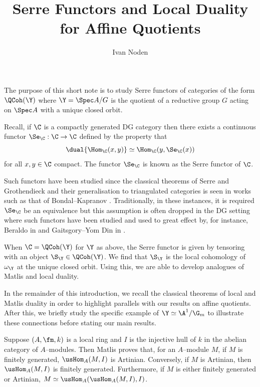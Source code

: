 \documentclass{amsart}
\title{Serre Functors and Local Duality for Affine Quotients}
\author{Ivan Noden}
\date{}
\begin{document}
  \maketitle

  \setcounter{tocdepth}{1}
  \tableofcontents


  The purpose of this short note is to study Serre functors
  of categories of the form \(\QCoh(\Y)\)
  where \(\Y = \Spec A/G\) is the quotient of
  a reductive group \(G\) acting on \(\Spec A\) with a
  unique closed orbit.

  \sssec{}

  Recall, if \(\C\) is a compactly generated DG category then there exists
  a continuous functor \(\Se_\C: \C \to \C\) defined by the
  property that
  \begin{displaymath}
    \dual{\Hom_{\C}(x,y)} \simeq \Hom_{\C}(y, \Se_\C(x))
  \end{displaymath}
  for all \(x, y \in \C\) compact. The functor \(\Se_\C\)
  is known as the Serre functor of \(\C\).

  Such functors have been studied since the classical
  theorems of Serre and Grothendieck and their
  generalisation to triangulated categories is seen
  in works such as that of Bondal--Kapranov \cite{bondal_kapranov:1990}.
  Traditionally, in these instances, it is required \(\Se_\C\)
  be an equivalence but this assumption is often
  dropped in the DG setting where such functors have been
  studied and used to great effect by, for instance,
  Beraldo in \cite{beraldo:2021} and Gaitsgory--Yom Din in
  \cite{gaitsgory_yom_din:2017}.

  \sssec{}

  When \(\C = \QCoh(\Y)\) for \(\Y\) as above,
  the Serre functor is given by tensoring
  with an object \(\S_\Y \in \QCoh(\Y)\).
  We find that \(\S_\Y\)
  is the local cohomology
  of \(\omega_\Y\) at the unique closed
  orbit. Using this, we are able to
  develop analogues of Matlis and local
  duality.

  In the remainder of this introduction,
  we recall the classical theorems
  of local and Matlis duality 
  in order to highlight parallels with our results on affine quotients.
  After this, we briefly
  study the specific example of \(\Y \simeq \A^1/\G_m\)
  to illustrate these connections before stating our main results.

  \sssec{}

  Suppose \((A, \fm, k)\) is a local
  ring and \(I\) is the injective hull of \(k\) in the
  abelian category of \(A\)--modules. Then Matlis proves that,
  for an \(A\)--module \(M\),
  if \(M\) is finitely generated, \(\usHom_A(M, I)\)
  is Artinian. Conversely, if \(M\) is Artinian, then \(\usHom_A(M, I)\)
  is finitely generated. Furthermore, if \(M\) is
  either finitely generated or Artinian, \(M \simeq \usHom_A(\usHom_A(M,I), I)\).
\end{document}
